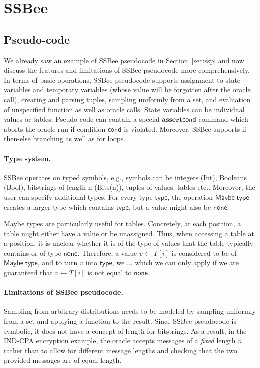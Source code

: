 \section{SSBee}
\subsection{Pseudo-code}
We already saw an example of SSBee pseudocode in Section~\ref{sec:ssp} and now discuss the features and limitations of SSBee pseudocode more comprehensively.
In terms of basic operations, SSBee pseudocode supports assignment to state variables and temporary variables (whose value will be forgotten after the oracle call), creating and parsing tuples, sampling uniformly from a set, and evaluation of unspecified function as well as oracle calls. State variables can be individual values or tables. Pseudo-code can contain a special $\mathbf{assert}\mathsf{ cond}$ command which aborts the oracle run if condition $\mathsf{cond}$ is violated. Moreover, SSBee supports if-then-else branching as well as for loops.

\paragraph{Type system.}
SSBee operates on typed symbols, e.g., symbols can be integers (Int),
Booleans (Bool), bitstrings of length n (Bits(n)), tuples of values,
tables etc.. Moreover, the user can specify additional types. For 
every type $\mathsf{type}$, the operation $\mathsf{Maybe}\;\mathsf{type}$
creates a larger type which contains $\mathsf{type}$, but a value
might also be $\mathsf{none}$.

Maybe types are particularly useful for tables. Concretely, at each position, a table might either have a value or be unassigned. Thus, when accessing a table at a position, it is unclear whether it is of the type of values that the table typically contains or of type $\mathsf{none}$. Therefore, a value $v\leftarrow T[i]$ is considered to be of $\mathsf{Maybe}\;\mathsf{type}$, and to turn $v$ into $\mathsf{type}$, we ... which we can only apply if we are guaranteed that $v\leftarrow T[i]$ is not 
equal to $\mathsf{none}$.

\paragraph{Limitations of SSBee pseudocode.}
Sampling from arbitrary distributions needs to be modeled by sampling uniformly from
a set and applying a function to the result. Since SSBee pseudocode is symbolic, it
does not have a concept of length for bitstrings. As a result, in the IND-CPA encryption example, the oracle accepts messages of a \emph{fixed} length $n$ rather
than to allow for different message lengths and checking that the two provided messages are of equal length.